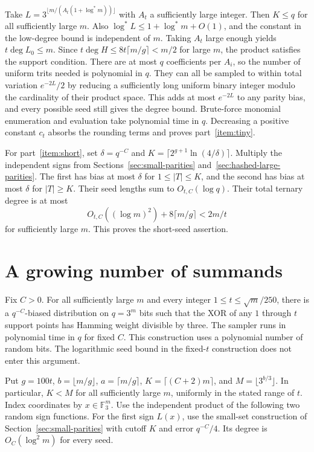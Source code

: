 \documentclass[11pt]{article}
\begin{document}
Take $L=3^{\lfloor m/(A_t(1+\log^*m))\rfloor}$ with
$A_t$ a sufficiently large integer. Then $K\le q$ for all sufficiently
large $m$. Also $\log^* L\le 1+\log^*m+O(1)$, and the constant in
the low-degree bound is independent of $m$. Taking $A_t$ large
enough yields $t\deg L_0\le m$. Since $t\deg H\le
8t\lceil m/g\rceil<m/2$ for large $m$, the product satisfies the
support condition. There are at most $q$ coefficients per $A_i$,
so the number of uniform trits needed is polynomial in $q$.
They can all be sampled to within total variation
$e^{-2L}/2$ by reducing a sufficiently long uniform binary integer
modulo the cardinality of their product space. This adds at most
$e^{-2L}$ to any parity bias, and every possible seed still gives
the degree bound. Brute-force monomial enumeration and evaluation
take polynomial time in $q$. Decreasing a positive constant $c_t$
absorbs the rounding terms and proves part~\ref{item:tiny}.

For part~\ref{item:short}, set $\delta=q^{-C}$ and
$K=\lceil 2^{g+1}\ln(4/\delta)\rceil$.
Multiply the independent signs from Sections~\ref{sec:small-parities}
and~\ref{sec:hashed-large-parities}. The first has bias at most
$\delta$ for $1\le |T|\le K$, and the second has bias at most
$\delta$ for $|T|\ge K$. Their seed lengths sum to
$O_{t,C}(\log q)$. Their total ternary degree is at most
\[
     O_{t,C}((\log m)^2)+8\lceil m/g\rceil < 2m/t
\]
for sufficiently large $m$. This proves the short-seed assertion.
\section{A growing number of summands}
\label{sec:growing-summands}

Fix $C>0$. For all sufficiently large $m$ and every integer
$1\le t\le \sqrt m/250$, there is a $q^{-C}$-biased distribution
on $q=3^m$ bits such that the XOR of any $1$ through $t$ support
points has Hamming weight divisible by three. The sampler runs in
polynomial time in $q$ for fixed $C$. This construction uses a
polynomial number of random bits. The logarithmic seed bound in the
fixed-$t$ construction does not enter this argument.

Put $g=100t$, $b=\lfloor m/g\rfloor$, $a=\lceil m/g\rceil$,
$K=\lceil(C+2)m\rceil$, and $M=\lfloor3^{b/3}\rfloor$.
In particular, $K<M$ for all sufficiently large $m$, uniformly in
the stated range of $t$. Index coordinates by $x\in\mathbb F_3^m$.
Use the independent product of the following two random sign functions.
For the first sign $L(x)$, use the small-set construction of
Section~\ref{sec:small-parities} with cutoff $K$ and error
$q^{-C}/4$. Its degree is $O_C(\log^2 m)$ for every seed.
\end{document}
